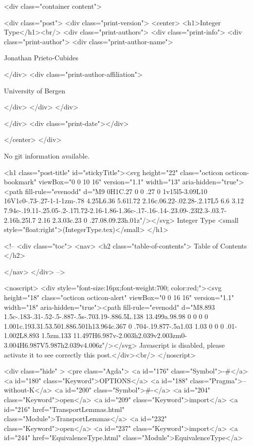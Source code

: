       <div class="container content">
        







<div class="post">
  <div class="print-version">
    <center>
      <h1>Integer Type</h1><br/>
        <div class="print-authors">
          <div class="print-info">
            <div class="print-author">
              <div class="print-author-name">
                
                  Jonathan Prieto-Cubides
                
              </div>
              <div class="print-author-affiliation">
                
                  University of Bergen
                
                </div>
            </div>
          </div>
          
          
        </div>
        <div class="print-date"></div>
        
        
    </center>
  </div>

  
  No git information available.
  

  <h1 class="post-title" id="stickyTitle"><svg height="22" class="octicon octicon-bookmark" viewBox="0 0 10 16" version="1.1" width="13" aria-hidden="true"><path fill-rule="evenodd" d="M9 0H1C.27 0 0 .27 0 1v15l5-3.09L10 16V1c0-.73-.27-1-1-1zm-.78 4.25L6.36 5.61l.72 2.16c.06.22-.02.28-.2.17L5 6.6 3.12 7.94c-.19.11-.25.05-.2-.17l.72-2.16-1.86-1.36c-.17-.16-.14-.23.09-.23l2.3-.03.7-2.16h.25l.7 2.16 2.3.03c.23 0 .27.08.09.23h.01z"/></svg> Integer Type <small style="float:right">(IntegerType.tex)</small>
  </h1>

  <!-- 
  <div class="toc">
    <nav>
    <h2 class="table-of-contents"> Table of Contents </h2>
      

    </nav>
  </div>
   -->

  <noscript>
  <div style="font-size:16px;font-weight:700; color:red;"><svg height="18" class="octicon octicon-alert" viewBox="0 0 16 16" version="1.1" width="18" aria-hidden="true"><path fill-rule="evenodd" d="M8.893 1.5c-.183-.31-.52-.5-.887-.5s-.703.19-.886.5L.138 13.499a.98.98 0 0 0 0 1.001c.193.31.53.501.886.501h13.964c.367 0 .704-.19.877-.5a1.03 1.03 0 0 0 .01-1.002L8.893 1.5zm.133 11.497H6.987v-2.003h2.039v2.003zm0-3.004H6.987V5.987h2.039v4.006z"/></svg> Javascript is disabled, please activate it to see correctly this post.</div><br/>
  </noscript>

  <div class="hide" >
<pre class="Agda">
<a id="176" class="Symbol">{-#</a> <a id="180" class="Keyword">OPTIONS</a> <a id="188" class="Pragma">--without-K</a> <a id="200" class="Symbol">#-}</a>
<a id="204" class="Keyword">open</a> <a id="209" class="Keyword">import</a> <a id="216" href="TransportLemmas.html" class="Module">TransportLemmas</a>
<a id="232" class="Keyword">open</a> <a id="237" class="Keyword">import</a> <a id="244" href="EquivalenceType.html" class="Module">EquivalenceType</a>

